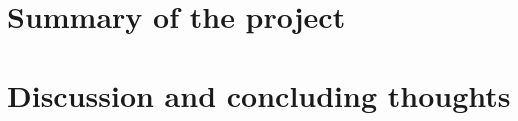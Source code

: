 \documentclass[12pt,a4paper,openright,twoside]{book}
\begin{document}
\section{Summary of the project}

\section{Discussion and concluding thoughts}



\nocite{*} %


\end{document}

